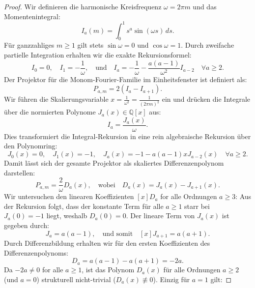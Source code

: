 \documentclass[11pt,a4paper]{article}
\theoremstyle{definition}
\begin{document}
	\begin{proof}
		Wir definieren die harmonische Kreisfrequenz $\omega = 2\pi m$ und das Momentenintegral:
		\begin{equation}
			I_a(m) = \int_0^1 s^a \sin(\omega s) \, ds.
		\end{equation}
		Für ganzzahliges $m \ge 1$ gilt stets $\sin\omega = 0$ und $\cos\omega = 1$. Durch zweifache partielle Integration erhalten wir die exakte Rekursionsformel:
		\begin{equation}
			I_0 = 0, \quad I_1 = -\frac{1}{\omega}, \quad \text{und} \quad I_a = -\frac{1}{\omega} - \frac{a(a-1)}{\omega^2} I_{a-2} \quad \forall a \ge 2.
		\end{equation}
		Der Projektor für die Monom-Fourier-Familie im Einheitsfenster ist definiert als:
		\begin{equation}
			P_{a,m} = 2\left(I_a - I_{a+1}\right).
		\end{equation}
		Wir führen die Skalierungsvariable $x = \frac{1}{\omega^2} = \frac{1}{(2\pi m)^2}$ ein und drücken die Integrale über die normierten Polynome $J_a(x) \in \mathbb{Q}[x]$ aus:
		\begin{equation}
			I_a = \frac{J_a(x)}{\omega}.
		\end{equation}
		Dies transformiert die Integral-Rekursion in eine rein algebraische Rekursion über den Polynomring:
		\begin{equation}
			J_0(x) = 0, \quad J_1(x) = -1, \quad J_a(x) = -1 - a(a-1)x J_{a-2}(x) \quad \forall a \ge 2.
		\end{equation}
		Damit lässt sich der gesamte Projektor als skaliertes Differenzenpolynom darstellen:
		\begin{equation}
			P_{a,m} = \frac{2}{\omega} D_a(x), \quad \text{wobei} \quad D_a(x) = J_a(x) - J_{a+1}(x).
		\end{equation}
		Wir untersuchen den linearen Koeffizienten $[x]D_a$ for alle Ordnungen $a \ge 3$:
		Aus der Rekursion folgt, dass der konstante Term für alle $a \ge 1$ starr bei $J_a(0) = -1$ liegt, weshalb $D_a(0) = 0$. Der lineare Term von $J_a(x)$ ist gegeben durch:
		\begin{equation}
			[x]J_a = a(a-1), \quad \text{und somit} \quad [x]J_{a+1} = a(a+1).
		\end{equation}
		Durch Differenzbildung erhalten wir für den ersten Koeffizienten des Differenzenpolynoms:
		\begin{equation}
			[x]D_a = a(a-1) - a(a+1) = -2a.
		\end{equation}
		Da $-2a \neq 0$ for alle $a \ge 1$, ist das Polynom $D_a(x)$ für alle Ordnungen $a \ge 2$ (und $a=0$) strukturell nicht-trivial ($D_a(x) \not\equiv 0$). Einzig für $a=1$ gilt:

\end{proof}
\end{document}

